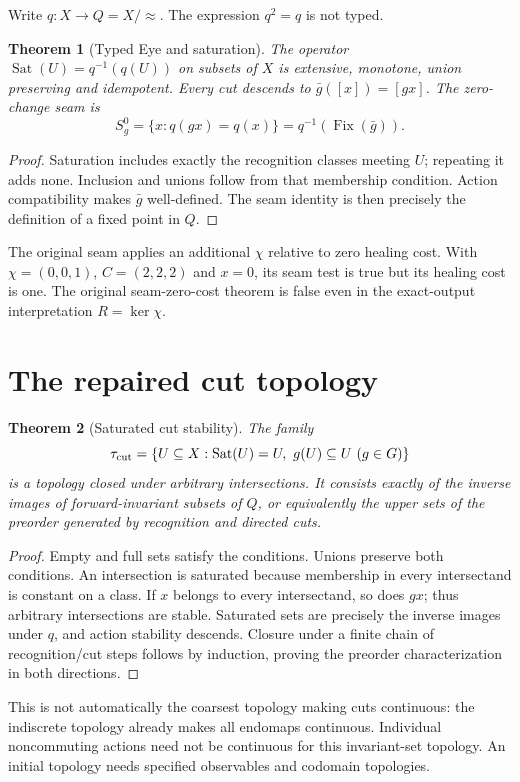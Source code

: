 \documentclass[11pt]{article}
\newtheorem{theorem}{Theorem}
\newcommand{\Sat}{\operatorname{Sat}}
\newcommand{\Fix}{\operatorname{Fix}}
\begin{document}
Write $q:X\to Q=X/{\approx}$. The expression $q^2=q$ is not typed.
\begin{theorem}[Typed Eye and saturation]
The operator $\Sat(U)=q^{-1}(q(U))$ on subsets of $X$ is extensive,
monotone, union preserving and idempotent. Every cut descends to
$\bar g([x])=[gx]$. The zero-change seam is
\[
S_g^0=\{x:q(gx)=q(x)\}=q^{-1}(\Fix(\bar g)).
\]
\end{theorem}
\begin{proof}
Saturation includes exactly the recognition classes meeting $U$; repeating
it adds none. Inclusion and unions follow from that membership condition.
Action compatibility makes $\bar g$ well-defined. The seam identity is
then precisely the definition of a fixed point in $Q$.
\end{proof}
The original seam applies an additional $\chi$ relative to zero healing
cost. With $\chi=(0,0,1)$, $C=(2,2,2)$ and $x=0$, its seam test is true
but its healing cost is one. The original seam-zero-cost theorem is false
even in the exact-output interpretation $R=\ker\chi$.

\section{The repaired cut topology}
\begin{theorem}[Saturated cut stability]
The family
\[
\tau_{\rm cut}=\{U\subseteq X:\Sat(U)=U,\ g(U)\subseteq U\ (g\in G)\}
\]
is a topology closed under arbitrary intersections. It consists exactly of
the inverse images of forward-invariant subsets of $Q$, or equivalently
the upper sets of the preorder generated by recognition and directed cuts.
\end{theorem}
\begin{proof}
Empty and full sets satisfy the conditions. Unions preserve both conditions.
An intersection is saturated because membership in every intersectand is
constant on a class. If $x$ belongs to every intersectand, so does $gx$;
thus arbitrary intersections are stable. Saturated sets are precisely the
inverse images under $q$, and action stability descends. Closure under a
finite chain of recognition/cut steps follows by induction, proving the
preorder characterization in both directions.
\end{proof}
This is not automatically the coarsest topology making cuts continuous:
the indiscrete topology already makes all endomaps continuous. Individual
noncommuting actions need not be continuous for this invariant-set topology.
An initial topology needs specified observables and codomain topologies.
\end{document}
